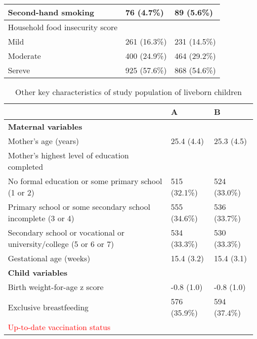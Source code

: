 \documentclass[
]{article}
\begin{document}
\begin{table}[H]
\begin{tabular}[t]{l|l|l}
\hline
Second-hand smoking & 76  (4.7\%) & 89  (5.6\%)\\
\hline
Household food insecurity score &  & \\
\hline
\hspace{1em}Mild & 261 (16.3\%) & 231 (14.5\%)\\
\hline
\hspace{1em}Moderate & 400 (24.9\%) & 464 (29.2\%)\\
\hline
\hspace{1em}Sereve & 925 (57.6\%) & 868 (54.6\%)\\
\hline
\end{tabular}
\end{table}

\begin{table}[H]

\caption{\label{tab:unnamed-chunk-3}Other key characteristics of study population of liveborn children}
\centering
\begin{tabular}[t]{l|l|l}
\hline
  & A & B\\
\hline
\textbf{Maternal variables} & \textbf{} & \textbf{}\\
\hline
\hspace{1em}Mother’s age (years) & 25.4 (4.4) & 25.3 (4.5)\\
\hline
\hspace{1em}Mother’s highest level of education completed &  & \\
\hline
\hspace{2em}No formal education or some primary school (1 or 2) & 515 (32.1\%) & 524 (33.0\%)\\
\hline
\hspace{2em}Primary school or some secondary school incomplete (3 or 4) & 555 (34.6\%) & 536 (33.7\%)\\
\hline
\hspace{2em}Secondary school or vocational or university/college (5 or 6 or 7) & 534 (33.3\%) & 530 (33.3\%)\\
\hline
\hspace{1em}Gestational age (weeks) & 15.4 (3.2) & 15.4 (3.1)\\
\hline
\textbf{Child variables} & \textbf{} & \textbf{}\\
\hline
\hspace{1em}Birth weight-for-age z score & -0.8 (1.0) & -0.8 (1.0)\\
\hline
\hspace{1em}Exclusive breastfeeding & 576 (35.9\%) & 594 (37.4\%)\\
\hline
\textcolor{red}{\hspace{1em}Up-to-date vaccination status} & \textcolor{red}{} & \textcolor{red}{}\\
\hline
\end{tabular}
\end{table}
\end{document}
